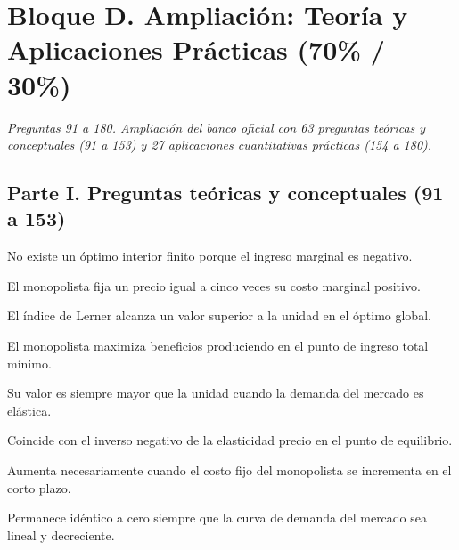 \section*{Bloque D. Ampliación: Teoría y Aplicaciones Prácticas (70\% / 30\%)}

\noindent\textit{Preguntas 91 a 180. Ampliación del banco oficial con 63 preguntas teóricas y conceptuales (91 a 153) y 27 aplicaciones cuantitativas prácticas (154 a 180).}

\subsection*{Parte I. Preguntas teóricas y conceptuales (91 a 153)}

\begin{opts}
    \item No existe un óptimo interior finito porque el ingreso marginal es negativo.
    \item El monopolista fija un precio igual a cinco veces su costo marginal positivo.
    \item El índice de Lerner alcanza un valor superior a la unidad en el óptimo global.
    \item El monopolista maximiza beneficios produciendo en el punto de ingreso total mínimo.
\end{opts}

\begin{opts}
    \item Su valor es siempre mayor que la unidad cuando la demanda del mercado es elástica.
    \item Coincide con el inverso negativo de la elasticidad precio en el punto de equilibrio.
    \item Aumenta necesariamente cuando el costo fijo del monopolista se incrementa en el corto plazo.
    \item Permanece idéntico a cero siempre que la curva de demanda del mercado sea lineal y decreciente.
\end{opts}

